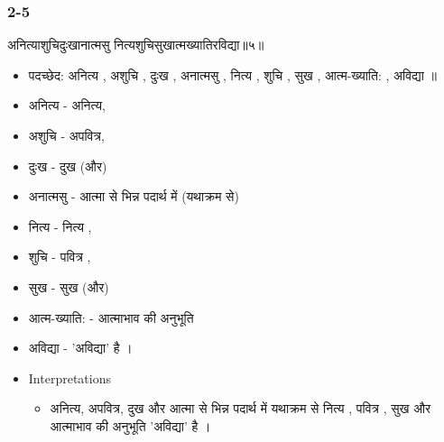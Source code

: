 \begin{frame}[fragile]\frametitle{2-5}
\begin{sanskrit}
अनित्याशुचिदुःखानात्मसु नित्यशुचिसुखात्मख्यातिरविद्या॥५॥
\end{sanskrit}

	\begin{itemize}
	\item पदच्छेद: अनित्य , अशुचि , दुःख , अनात्मसु , नित्य , शुचि , सुख , आत्म-ख्याति: , अविद्या ॥
	\item अनित्य - अनित्य,
	\item अशुचि - अपवित्र,
	\item दुःख - दुख (और)
	\item अनात्मसु - आत्मा से भिन्न पदार्थ में (यथाक्रम से)
	\item नित्य - नित्य ,
	\item शुचि - पवित्र ,
	\item सुख - सुख (और)
	\item आत्म-ख्याति: - आत्माभाव की अनुभूति
	\item अविद्या - 'अविद्या' है ।	
	\item Interpretations
		\begin{itemize}
		\item अनित्य, अपवित्र, दुख और आत्मा से भिन्न पदार्थ में यथाक्रम से नित्य , पवित्र , सुख और आत्माभाव की अनुभूति 'अविद्या' है ।
		\end{itemize}
	\end{itemize}
	
\end{frame}

